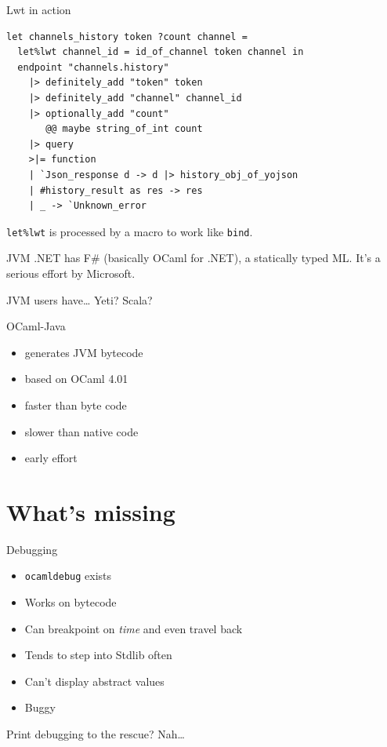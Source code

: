 \documentclass{beamer}
\begin{document}
\begin{frame}[fragile]{Lwt in action}
  \begin{verbatim}
let channels_history token ?count channel =
  let%lwt channel_id = id_of_channel token channel in
  endpoint "channels.history"
    |> definitely_add "token" token
    |> definitely_add "channel" channel_id
    |> optionally_add "count"
       @@ maybe string_of_int count
    |> query
    >|= function
    | `Json_response d -> d |> history_obj_of_yojson
    | #history_result as res -> res
    | _ -> `Unknown_error
  \end{verbatim}
	\texttt{let\%lwt} is processed by a macro to work like \texttt{bind}.
\end{frame}

\begin{frame}{JVM}
  .NET has F\# (basically OCaml for .NET), a statically typed ML. It's a serious
  effort by Microsoft.

  JVM users have… Yeti? Scala? \pause

  \begin{block}{OCaml-Java}
    \begin{itemize}
      \item generates JVM bytecode
      \item based on OCaml 4.01
      \item faster than byte code
      \item slower than native code
      \item early effort
    \end{itemize}
  \end{block}

\end{frame}

\section{What's missing}

\begin{frame}{Debugging}
  \begin{itemize}
    \item \texttt{ocamldebug} exists
    \item Works on bytecode
    \item Can breakpoint on \emph{time} and even travel back
    \item Tends to step into Stdlib often
    \item Can't display abstract values
    \item Buggy
  \end{itemize}
  Print debugging to the rescue? Nah…
\end{frame}
\end{document}
